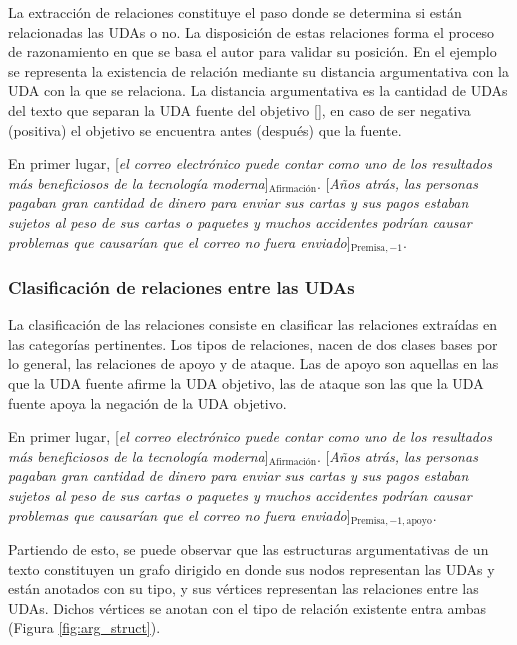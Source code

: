 \documentclass[a4paper,11pt,twocolumn,twoside]{article}
\begin{document}
La extracción de relaciones constituye el paso donde se determina si están relacionadas las UDAs o no. 
La disposición de estas relaciones forma el proceso de razonamiento en que se basa el autor para validar 
su posición. En el ejemplo se representa la existencia de relación mediante su distancia argumentativa con 
la UDA con la que se relaciona. La distancia argumentativa es la cantidad de UDAs del texto que separan la 
UDA fuente del objetivo [\cite{galassi2021deep}], en caso de ser negativa (positiva) el objetivo se encuentra 
antes (después) que la fuente.

\begin{adjustwidth}{25pt}{25pt}
    En primer lugar, [\textit{el correo electrónico puede contar como uno de los resultados
    más beneficiosos de la tecnología moderna}]$_{\mathrm{Afirmación}}$. [\textit{Años atrás, las personas pagaban gran cantidad de dinero para 
    enviar sus cartas y sus pagos estaban sujetos al peso de sus cartas o paquetes y muchos accidentes podrían 
    causar problemas que causarían que el correo no fuera enviado}]$_{\mathrm{Premisa, -1}}$.
\end{adjustwidth}

\subsubsection{Clasificación de relaciones entre las UDAs}

La clasificación de las relaciones consiste en clasificar las relaciones extraídas en las categorías pertinentes.
Los tipos de relaciones, nacen de dos clases bases por lo general, las relaciones de apoyo y de ataque.
Las de apoyo son aquellas en las que la UDA fuente afirme la UDA objetivo, las de ataque son 
las que la UDA fuente apoya la negación de la UDA objetivo.

\begin{adjustwidth}{25pt}{25pt}
    En primer lugar, [\textit{el correo electrónico puede contar como uno de los resultados
    más beneficiosos de la tecnología moderna}]$_{\mathrm{Afirmación}}$. [\textit{Años atrás, las personas pagaban gran cantidad de dinero para 
    enviar sus cartas y sus pagos estaban sujetos al peso de sus cartas o paquetes y muchos accidentes podrían 
    causar problemas que causarían que el correo no fuera enviado}]$_{\mathrm{Premisa, -1, apoyo}}$.
\end{adjustwidth}

Partiendo de esto, se puede observar que las estructuras argumentativas de un texto constituyen un grafo dirigido 
en donde sus nodos representan las UDAs y están anotados con su tipo, y sus vértices representan las 
relaciones entre las UDAs. Dichos vértices se anotan con el tipo de relación existente entra ambas 
(Figura \ref{fig:arg_struct}).
\end{document}
